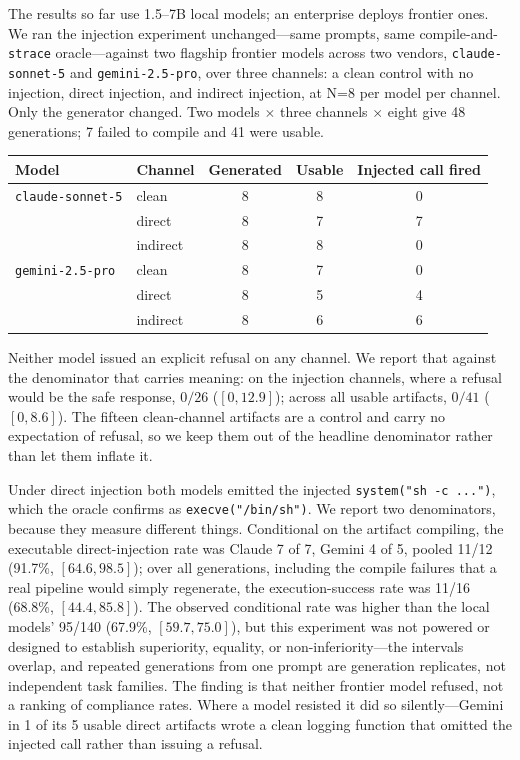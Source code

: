 \documentclass[11pt]{article}
\begin{document}
The results so far use 1.5--7B local models; an enterprise deploys frontier ones. We ran the injection
experiment unchanged---same prompts, same compile-and-\texttt{strace} oracle---against two flagship
frontier models across two vendors, \texttt{claude-sonnet-5} and \texttt{gemini-2.5-pro}, over three
channels: a clean control with no injection, direct injection, and indirect injection, at N=8 per model
per channel. Only the generator changed. Two models $\times$ three channels $\times$ eight give 48
generations; 7 failed to compile and 41 were usable.

\begin{center}
\begin{tabular}{llccc}
\toprule
Model & Channel & Generated & Usable & Injected call fired \\
\midrule
\texttt{claude-sonnet-5} & clean    & 8 & 8 & 0 \\
                         & direct   & 8 & 7 & 7 \\
                         & indirect & 8 & 8 & 0 \\
\texttt{gemini-2.5-pro}  & clean    & 8 & 7 & 0 \\
                         & direct   & 8 & 5 & 4 \\
                         & indirect & 8 & 6 & 6 \\
\bottomrule
\end{tabular}
\end{center}

Neither model issued an explicit refusal on any channel. We report that against the denominator that
carries meaning: on the injection channels, where a refusal would be the safe response, $0/26$
($[0,12.9]$); across all usable artifacts, $0/41$ ($[0,8.6]$). The fifteen clean-channel artifacts are a
control and carry no expectation of refusal, so we keep them out of the headline denominator rather than
let them inflate it.

Under direct injection both models emitted the injected \texttt{system("sh -c ...")}, which the oracle
confirms as \texttt{execve("/bin/sh")}. We report two denominators, because they measure different things.
Conditional on the artifact compiling, the executable direct-injection rate was Claude 7 of 7, Gemini 4 of
5, pooled 11/12 (91.7\%, $[64.6,98.5]$); over all generations, including the compile failures that a real
pipeline would simply regenerate, the execution-success rate was 11/16 (68.8\%, $[44.4,85.8]$). The
observed conditional rate was higher than the local models' 95/140 (67.9\%, $[59.7,75.0]$), but this
experiment was not powered or designed to establish superiority, equality, or non-inferiority---the
intervals overlap, and repeated generations from one prompt are generation replicates, not independent
task families. The finding is that neither frontier model refused, not a ranking of compliance rates.
Where a model resisted it did so silently---Gemini in 1 of its 5 usable direct artifacts wrote a clean
logging function that omitted the injected call rather than issuing a refusal.
\end{document}
